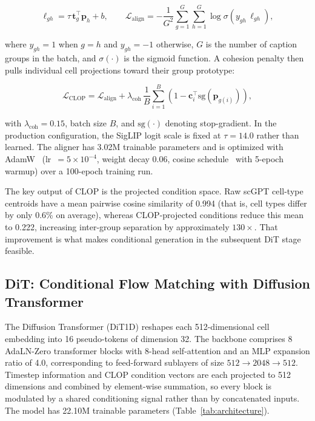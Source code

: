 \documentclass[genes,article,submit,pdftex,oneauthor]{Definitions/mdpi}
\begin{document}
\begin{linenomath}
\begin{equation}
\ell_{gh} = \tau\,\mathbf{t}_g^\top \mathbf{p}_h + b, \qquad
\mathcal{L}_\text{align} = -\frac{1}{G^2}\sum_{g=1}^{G}\sum_{h=1}^{G}\log\sigma\!\left(y_{gh}\,\ell_{gh}\right),
\label{eq:clop}
\end{equation}
\end{linenomath}

where $y_{gh}=1$ when $g=h$ and $y_{gh}=-1$ otherwise, $G$ is the number of caption groups in the batch, and $\sigma(\cdot)$ is the sigmoid function. A cohesion penalty then pulls individual cell projections toward their group prototype:

\begin{linenomath}
\begin{equation}
\mathcal{L}_\text{CLOP} = \mathcal{L}_\text{align} + \lambda_\text{coh}\,\frac{1}{B}\sum_{i=1}^{B}\left(1 - \mathbf{c}_i^\top \mathrm{sg}(\mathbf{p}_{g(i)})\right),
\end{equation}
\end{linenomath}

with $\lambda_\text{coh}=0.15$, batch size $B$, and $\mathrm{sg}(\cdot)$ denoting stop-gradient. In the production configuration, the SigLIP logit scale is fixed at $\tau = 14.0$ rather than learned. The aligner has 3.02M trainable parameters and is optimized with AdamW~\cite{ref-adamw} (lr~$= 5 \times 10^{-4}$, weight decay 0.06, cosine schedule~\cite{ref-cosine-schedule} with 5-epoch warmup) over a 100-epoch training run.

The key output of CLOP is the projected condition space. Raw scGPT cell-type centroids have a mean pairwise cosine similarity of 0.994 (that is, cell types differ by only 0.6\% on average), whereas CLOP-projected conditions reduce this mean to 0.222, increasing inter-group separation by approximately $130\times$. That improvement is what makes conditional generation in the subsequent DiT stage feasible.

\subsection{DiT: Conditional Flow Matching with Diffusion Transformer}\label{sec:dit}

The Diffusion Transformer (DiT1D) reshapes each 512-dimensional cell embedding into 16 pseudo-tokens of dimension 32. The backbone comprises 8 AdaLN-Zero transformer blocks with 8-head self-attention and an MLP expansion ratio of 4.0, corresponding to feed-forward sublayers of size $512 \to 2048 \to 512$. Timestep information and CLOP condition vectors are each projected to 512 dimensions and combined by element-wise summation, so every block is modulated by a shared conditioning signal rather than by concatenated inputs. The model has 22.10M trainable parameters (Table~\ref{tab:architecture}).
\end{document}

